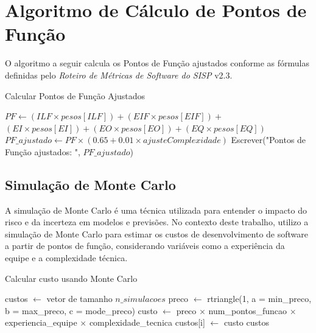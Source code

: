 \documentclass[12pt]{article}
\begin{document}
\section{Algoritmo de Cálculo de Pontos de Função}

O algoritmo a seguir calcula os Pontos de Função ajustados conforme as fórmulas definidas pelo \textit{Roteiro de Métricas de Software do SISP} v2.3.

\begin{algorithm}[H]
\caption{Calcular Pontos de Função Ajustados}
\begin{algorithmic}[1]
    \State $PF \gets (ILF \times pesos[ILF]) + (EIF \times pesos[EIF]) +$
    \State \hspace{3.5em} $(EI \times pesos[EI]) + (EO \times pesos[EO]) + (EQ \times pesos[EQ])$
    \State $PF\_ajustado \gets PF \times (0.65 + 0.01 \times ajusteComplexidade)$
    \State Escrever("Pontos de Função ajustados: ", $PF\_ajustado$)
\EndProcedure
\end{algorithmic}
\end{algorithm}

\subsection{Simulação de Monte Carlo}

A simulação de Monte Carlo é uma técnica utilizada para entender o impacto do risco e da incerteza em modelos e previsões. No contexto deste trabalho, utilizo a simulação de Monte Carlo para estimar os custos de desenvolvimento de software a partir de pontos de função, considerando variáveis como a experiência da equipe e a complexidade técnica.

\begin{algorithm}[H]
\caption{Calcular custo usando Monte Carlo}
\begin{algorithmic}[1]
    \State custos $\leftarrow$ vetor de tamanho $n\_simulacoes$
        \State preco $\leftarrow$ rtriangle(1, a = min\_preco, b = max\_preco, c = mode\_preco)
        \State custo $\leftarrow$ preco $\times$ num\_pontos\_funcao $\times$ experiencia\_equipe $\times$ complexidade\_tecnica
        \State custos[i] $\leftarrow$ custo
    \EndFor
    \State \Return custos
\EndProcedure
\end{algorithmic}
\end{algorithm}
\end{document}

